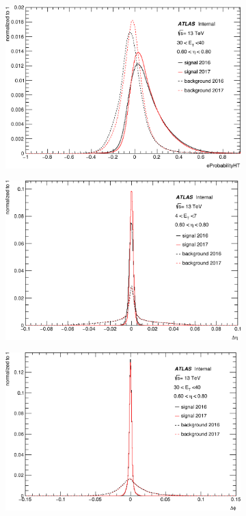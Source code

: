 \begin{figure}[p]
\centering
  \begin{subfigure}[b]{0.49\textwidth}
    \centering
    \includegraphics[width=1.0\textwidth]{figs/egamma/trig_eProb_highet.png} 
    \label{fig:egamma:trig_eProbHT}
  \end{subfigure}
  \hfill
  \begin{subfigure}[b]{0.49\textwidth}
    \centering
    \includegraphics[width=1.0\textwidth]{figs/egamma/trig_deltaeta_highet.png} 
    \label{fig:egamma:trig_deltaEta_1}
  \end{subfigure}
  \hfill
  \begin{subfigure}[b]{0.49\textwidth}
    \centering
    \includegraphics[width=1.0\textwidth]{figs/egamma/trig_deltaphi_highet.png} 

\end{subfigure}
\end{figure}
